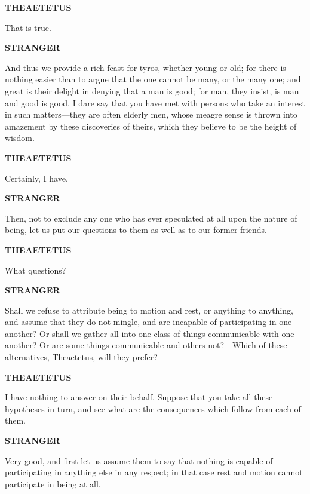 \documentclass[11pt,letter]{article}
\begin{document}
\par \textbf{THEAETETUS}
\par   That is true.

\par \textbf{STRANGER}
\par   And thus we provide a rich feast for tyros, whether young or old; for there is nothing easier than to argue that the one cannot be many, or the many one; and great is their delight in denying that a man is good; for man, they insist, is man and good is good. I dare say that you have met with persons who take an interest in such matters—they are often elderly men, whose meagre sense is thrown into amazement by these discoveries of theirs, which they believe to be the height of wisdom.

\par \textbf{THEAETETUS}
\par   Certainly, I have.

\par \textbf{STRANGER}
\par   Then, not to exclude any one who has ever speculated at all upon the nature of being, let us put our questions to them as well as to our former friends.

\par \textbf{THEAETETUS}
\par   What questions?

\par \textbf{STRANGER}
\par   Shall we refuse to attribute being to motion and rest, or anything to anything, and assume that they do not mingle, and are incapable of participating in one another? Or shall we gather all into one class of things communicable with one another? Or are some things communicable and others not?—Which of these alternatives, Theaetetus, will they prefer?

\par \textbf{THEAETETUS}
\par   I have nothing to answer on their behalf. Suppose that you take all these hypotheses in turn, and see what are the consequences which follow from each of them.

\par \textbf{STRANGER}
\par   Very good, and first let us assume them to say that nothing is capable of participating in anything else in any respect; in that case rest and motion cannot participate in being at all.
\end{document}
